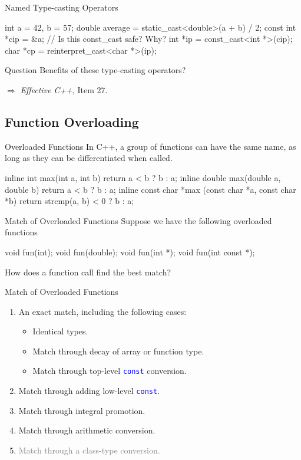 \documentclass[handout]{beamer}
\newcommand{\blue}[1]{\textcolor{blue}{#1}}
\newcommand{\gray}[1]{\textcolor{gray}{#1}}
\newcommand{\ttt}[1]{\texttt{#1}}
\newcommand{\bluett}[1]{\blue{\ttt{#1}}}
\newenvironment{question}{\begin{alertblock}{Question}}{\end{alertblock}}
\theoremstyle{definition}
\begin{document}
\begin{frame}[fragile]{Named Type-casting Operators}
    \begin{cpp}
int a = 42, b = 57;
double average = static_cast<double>(a + b) / 2;
const int *cip = &a;
// Is this const_cast safe? Why?
int *ip = const_cast<int *>(cip);
char *cp = reinterpret_cast<char *>(ip);
    \end{cpp}
    \pause
    \begin{question}
        Benefits of these type-casting operators?
    \end{question}
    \pause
    \(\Rightarrow\) \textit{Effective C++}, Item 27.
\end{frame}

\subsection{Function Overloading}

\begin{frame}[fragile]{Overloaded Functions}
    In C++, a group of functions can have the same name, as long as they can be differentiated when called.
    \begin{cpp}
inline int max(int a, int b) {
  return a < b ? b : a;
}
inline double max(double a, double b) {
  return a < b ? b : a;
}
inline const char *max
    (const char *a, const char *b) {
  return strcmp(a, b) < 0 ? b : a;
}
    \end{cpp}
\end{frame}

\begin{frame}[fragile]{Match of Overloaded Functions}
    Suppose we have the following overloaded functions
    \begin{cpp}
void fun(int);
void fun(double);
void fun(int *);
void fun(int const *);
    \end{cpp}
    How does a function call find the best match?
\end{frame}

\begin{frame}{Match of Overloaded Functions}
    \begin{enumerate}
        \item An exact match, including the following cases:
        \begin{itemize}
            \item Identical types.
            \item Match through decay of array or function type.
            \item Match through top-level \bluett{const} conversion.
        \end{itemize}
        \item Match through adding low-level \bluett{const}.
        \item Match through integral promotion.
        \item Match through arithmetic conversion.
        \item \gray{Match through a class-type conversion.}
    \end{enumerate}
\end{frame}
\end{document}
